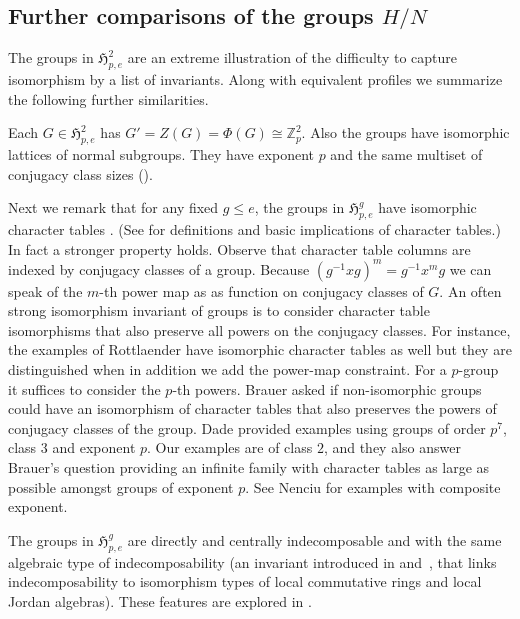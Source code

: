 \documentclass{toc}
\numberwithin{equation}{section}
\theoremstyle{plain}       %
\theoremstyle{remark}
\theoremstyle{definition}
\numberwithin{figure}{section}
\numberwithin{table}{section}
\newcommand{\mygroups}{\mathfrak{H}}
\begin{document}
\subsection{Further comparisons of the groups \texorpdfstring{$H/N$}{H/N}}\label{sec:invariants}


The groups in $\mygroups_{p,e}^{2}$ are an extreme illustration of the
difficulty to capture isomorphism by a list of invariants.  Along with
equivalent profiles we summarize the following further similarities.
\medskip

Each $G\in \mygroups_{p,e}^{2}$ has $G'=Z(G)=\Phi(G)\cong \mathbb{Z}_p^2$.  Also
the groups have isomorphic lattices of normal subgroups.  They have exponent $p$
and the same multiset of conjugacy class sizes ().


Next we remark that for any fixed $g\leq e$, the groups in $\mygroups_{p,e}^{g}$
have isomorphic character tables \cite[Section~6.2]{LW}. (See
\cite[p. 232]{Robinson}
for definitions and basic implications of character tables.)  In fact a stronger
property holds.  Observe that character table columns are indexed by conjugacy
classes of a group.  Because $(g^{-1}xg)^m=g^{-1}x^m g$ we can speak of the
$m$-th power map as as function on conjugacy classes of $G$.  An often strong
isomorphism invariant of groups is to consider character table isomorphisms that
also preserve all powers on the conjugacy classes.  For instance, the examples
of Rottlaender have isomorphic character tables as well but they are
distinguished when in addition we add the power-map constraint. For a $p$-group
it suffices to consider the $p$-th powers.  Brauer asked if non-isomorphic
groups could have an isomorphism of character tables that also preserves the
powers of conjugacy classes of the group.  Dade \cite{Dade} provided examples
using groups of order $p^7$, class $3$ and exponent $p$.  Our examples are of
class $2$, and they also answer Brauer's question providing an infinite family
with character tables as large as possible amongst groups of exponent $p$.  See
Nenciu \cite{Nenciu} for examples with composite exponent.


The groups in $\mygroups_{p,e}^{g}$ are directly and centrally indecomposable
and with the same algebraic type of indecomposability (an invariant introduced
in \cite[Theorem~4.41]{Wilson:unique-cent} and~\cite[Theorem~8]{Wilson:RemakI},
that links indecomposability to isomorphism types of local commutative rings and
local Jordan algebras). These features are explored in \cite[Section 5]{LW}. 
\end{document}
